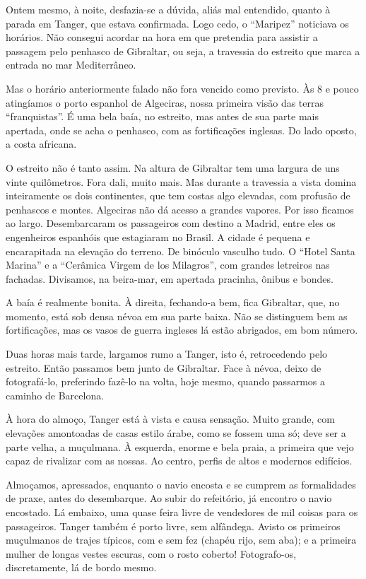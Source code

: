 Ontem mesmo, à noite, desfazia-se a dúvida, aliás mal entendido, quanto à parada em Tanger, que estava confirmada. Logo cedo, o ``Maripez'' noticiava os horários. Não consegui acordar na hora em que pretendia para assistir a passagem pelo penhasco de Gibraltar, ou seja, a travessia do estreito que marca a entrada no mar Mediterrâneo.

Mas o horário anteriormente falado não fora vencido como previsto. Às 8 e pouco atingíamos o porto espanhol de Algeciras, nossa primeira visão das terras ``franquistas''. É uma bela baía, no estreito, mas antes de sua parte mais apertada, onde se acha o penhasco, com as fortificações inglesas. Do lado oposto, a costa africana.

O estreito não é tanto assim. Na altura de Gibraltar tem uma largura de uns vinte quilômetros. Fora dali, muito mais. Mas durante a travessia a vista domina inteiramente os dois continentes, que tem costas algo elevadas, com profusão de penhascos e montes. Algeciras não dá acesso a grandes vapores. Por isso ficamos ao largo. Desembarcaram os passageiros com destino a Madrid, entre eles os engenheiros espanhóis que estagiaram no Brasil. A cidade é pequena e encarapitada na elevação do terreno. De binóculo vasculho tudo. O ``Hotel Santa Marina'' e a ``Cerâmica Virgem de los Milagros'', com grandes letreiros nas fachadas. Divisamos, na beira-mar, em apertada pracinha, ônibus e bondes.

A baía é realmente bonita. À direita, fechando-a bem, fica Gibraltar, que, no momento, está sob densa névoa em sua parte baixa. Não se distinguem bem as fortificações, mas os vasos de guerra ingleses lá estão abrigados, em bom número.

Duas horas mais tarde, largamos rumo a Tanger, isto é, retrocedendo pelo estreito. Então passamos bem junto de Gibraltar. Face à névoa, deixo de fotografá-lo, preferindo fazê-lo na volta, hoje mesmo, quando passarmos a caminho de Barcelona.

À hora do almoço, Tanger está à vista e causa sensação. Muito grande, com elevações amontoadas de casas estilo árabe, como se fossem uma só; deve ser a parte velha, a muçulmana. À esquerda, enorme e bela praia, a primeira que vejo capaz de rivalizar com as nossas. Ao centro, perfis de altos e modernos edifícios.

Almoçamos, apressados, enquanto o navio encosta e se cumprem as formalidades de praxe, antes do desembarque. Ao subir do refeitório, já encontro o navio encostado. Lá embaixo, uma quase feira livre de vendedores de mil coisas para os passageiros. Tanger também é porto livre, sem alfândega. Avisto os primeiros muçulmanos de trajes típicos, com e sem fez (chapéu rijo, sem aba); e a primeira mulher de longas vestes escuras, com o rosto coberto! Fotografo-os, discretamente, lá de bordo mesmo.

